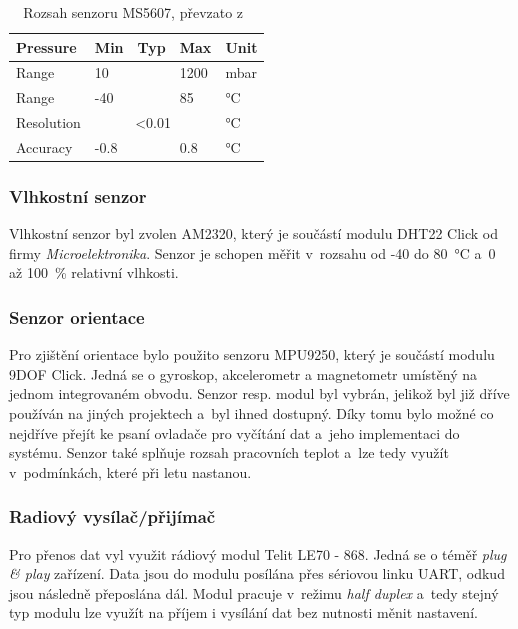 \documentclass[twoside]{ctuthesis}
\theoremstyle{plain}
\theoremstyle{definition}
\theoremstyle{note}
\begin{document}
			\begin{table}[]
				\begin{tabular}{|l|lll|l|}
				\hline
				Pressure   & \multicolumn{1}{l|}{Min}  & \multicolumn{1}{l|}{Typ} & Max  & Unit \\ \hline
				Range      & \multicolumn{1}{l|}{10}   & \multicolumn{1}{l|}{}    & 1200 & mbar \\ \hline
				Range      & \multicolumn{1}{l|}{-40}  & \multicolumn{1}{l|}{}    & 85   & °C   \\ \hline
				Resolution & \multicolumn{3}{c|}{\textless{}0.01}                        & °C   \\ \hline
				Accuracy   & \multicolumn{1}{l|}{-0.8} & \multicolumn{1}{l|}{}    & 0.8  & °C   \\ \hline
				\end{tabular}
				\caption{Rozsah senzoru MS5607, převzato z~\cite{dsh_MS5607}}
				\label{tab:ms:range}
			\end{table}

			


			
			\subsubsection{Vlhkostní senzor}
			Vlhkostní senzor byl zvolen AM2320, který je součástí modulu DHT22 Click od firmy \textit{Microelektronika}. Senzor je schopen měřit v~rozsahu od -40 do 80~°C a~0 až 100~\% relativní vlhkosti. 



			
			\subsubsection{Senzor orientace}
			Pro zjištění orientace bylo použito senzoru MPU9250, který je součástí modulu 9DOF Click. Jedná se o gyroskop, akcelerometr a magnetometr umístěný na jednom integrovaném obvodu. Senzor resp. modul byl vybrán, jelikož byl již dříve používán na jiných projektech a~byl ihned dostupný. Díky tomu bylo možné co nejdříve přejít ke psaní ovladače pro vyčítání dat a~jeho implementaci do systému. Senzor také splňuje rozsah pracovních teplot \cite{dsh_mpu} a~lze tedy využít v~podmínkách, které při letu nastanou.  
			

			\subsubsection{Radiový vysílač/přijímač}
			\label{sec:telit}
			Pro přenos dat vyl využit rádiový modul Telit LE70 - 868. Jedná se o téměř \textit{plug \& play} zařízení. Data jsou do modulu posílána přes sériovou linku UART, odkud jsou následně přeposlána dál. Modul pracuje v~režimu \textit{half duplex} a~tedy stejný typ modulu lze využít na příjem i vysílání dat bez nutnosti měnit nastavení. 
\end{document}
